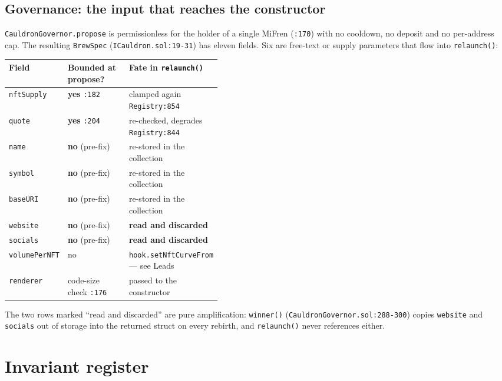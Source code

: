 \documentclass[11pt,a4paper]{article}
\newcommand{\code}[1]{\texttt{\small #1}}
\newcommand{\fileref}[1]{\texttt{\scriptsize #1}}
\begin{document}
\subsection{Governance: the input that reaches the constructor}

\code{CauldronGovernor.propose} is permissionless for the holder of a single MiFren
(\fileref{:170}) with no cooldown, no deposit and no per-address cap. The resulting
\code{BrewSpec} (\fileref{ICauldron.sol:19-31}) has eleven fields. Six are free-text or
supply parameters that flow into \code{relaunch()}:

\begin{longtable}{@{}llp{0.42\linewidth}@{}}
\toprule
\textbf{Field} & \textbf{Bounded at propose?} & \textbf{Fate in \code{relaunch()}} \\
\midrule
\endhead
\code{nftSupply}    & \textbf{yes} \fileref{:182} & clamped again \fileref{Registry:854} \\
\code{quote}        & \textbf{yes} \fileref{:204} & re-checked, degrades \fileref{Registry:844} \\
\code{name}         & \textcolor{critical}{\textbf{no}} (pre-fix) & re-stored in the collection \\
\code{symbol}       & \textcolor{critical}{\textbf{no}} (pre-fix) & re-stored in the collection \\
\code{baseURI}      & \textcolor{critical}{\textbf{no}} (pre-fix) & re-stored in the collection \\
\code{website}      & \textcolor{critical}{\textbf{no}} (pre-fix) & \textbf{read and discarded} \\
\code{socials}      & \textcolor{critical}{\textbf{no}} (pre-fix) & \textbf{read and discarded} \\
\code{volumePerNFT} & no & \code{hook.setNftCurveFrom} --- see Leads \\
\code{renderer}     & code-size check \fileref{:176} & passed to the constructor \\
\bottomrule
\end{longtable}

\noindent The two rows marked ``read and discarded'' are pure amplification:
\code{winner()} (\fileref{CauldronGovernor.sol:288-300}) copies \code{website} and
\code{socials} out of storage into the returned struct on every rebirth, and
\code{relaunch()} never references either.

\section{Invariant register}
\end{document}
